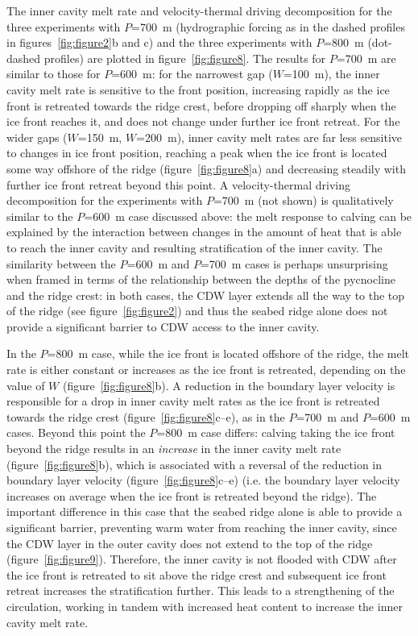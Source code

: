 \documentclass[draft]{agujournal2019}
\begin{document}
The inner cavity melt rate and velocity-thermal driving decomposition for the three experiments with $P$=700~m (hydrographic forcing as in the dashed profiles in figures~\ref{fig:figure2}b and c) and the three experiments with $P$=800~m (dot-dashed profiles) are plotted in figure~\ref{fig:figure8}. The results for $P$=700~m are similar to those for $P$=600~m: for the narrowest gap ($W$=100~m), the inner cavity melt rate is sensitive to the front position, increasing rapidly as the ice front is retreated towards the ridge crest, before dropping off sharply when the ice front reaches it, and does not change under further ice front retreat. For the wider gaps ($W$=150~m, $W$=200~m), inner cavity melt rates are far less sensitive to changes in ice front position, reaching a peak when the ice front is located some way offshore of the ridge (figure~\ref{fig:figure8}a) and decreasing steadily with further ice front retreat beyond this point. A velocity-thermal driving decomposition for the experiments with $P$=700~m (not shown) is qualitatively similar to the $P$=600~m case discussed above: the melt response to calving can be explained by the interaction between changes in the amount of heat that is able to reach the inner cavity and resulting stratification of the inner cavity. The similarity between the $P$=600~m and $P$=700~m cases is perhaps unsurprising when framed in terms of the relationship between the depths of the pycnocline and the ridge crest: in both cases, the CDW layer extends all the way to the top of the ridge (see figure~\ref{fig:figure2}) and thus the seabed ridge alone does not provide a significant barrier to CDW access to the inner cavity.

In the $P$=800~m case, while the ice front is located offshore of the ridge, the melt rate is either constant or increases as the ice front is retreated, depending on the value of $W$ (figure~\ref{fig:figure8}b). A reduction in the boundary layer velocity is responsible for a drop in inner cavity melt rates as the ice front is retreated towards the ridge crest (figure~\ref{fig:figure8}c--e), as in the $P$=700~m and $P$=600~m cases. Beyond this point the $P$=800~m case differs: calving taking the ice front beyond the ridge results in an \emph{increase} in the inner cavity melt rate (figure~\ref{fig:figure8}b), which is associated with a reversal of the reduction in boundary layer velocity (figure~\ref{fig:figure8}c--e) (i.e. the boundary layer velocity increases on average when the ice front is retreated beyond the ridge). The important difference in this case that the seabed ridge alone is able to provide a significant barrier, preventing warm water from reaching the inner cavity, since the CDW layer in the outer cavity does not extend to the top of the ridge (figure~\ref{fig:figure9}). Therefore, the inner cavity is not flooded with CDW after the ice front is retreated to sit above the ridge crest and subsequent ice front retreat increases the stratification further. This leads to a strengthening of the circulation, working in tandem with increased heat content to increase the inner cavity melt rate.
\end{document}
